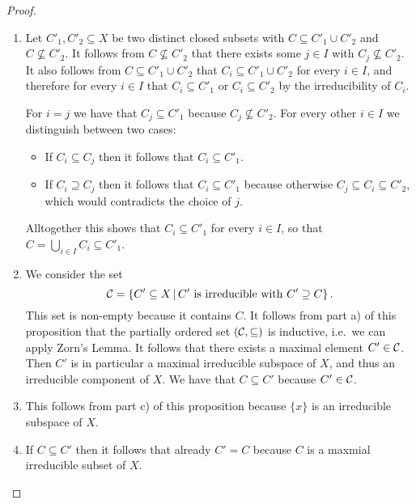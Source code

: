\begin{proof}
  \leavevmode
  \begin{enumerate}
    \item
      Let $C'_1, C'_2 \subseteq X$ be two distinct closed subsets with $C \subseteq C'_1 \cup C'_2$ and $C \nsubseteq C'_2$.
      It follows from $C \nsubseteq C'_2$ that there exists some $j \in I$ with $C_j \nsubseteq C'_2$.
      It also follows from $C \subseteq C'_1 \cup C'_2$ that $C_i \subseteq C'_1 \cup C'_2$ for every $i \in I$, and therefore for every $i \in I$ that $C_i \subseteq C'_1$ or $C_i \subseteq C'_2$ by the irreducibility of $C_i$.
      
      For $i = j$ we have that $C_j \subseteq C'_1$ because $C_j \nsubseteq C'_2$.
      For every other $i \in I$ we distinguish between two cases:
      \begin{itemize}
        \item
          If $C_i \subseteq C_j$ then it follows that $C_i \subseteq C'_1$.
        \item
          If $C_i \supseteq C_j$ then it follows that $C_i \subseteq C'_1$ because otherwise $C_j \subseteq C_i \subseteq C'_2$, which would contradicts the choice of $j$.
      \end{itemize}
      Alltogether this shows that $C_i \subseteq C'_1$ for every $i \in I$, so that $C = \bigcup_{i \in I} C_i \subseteq C'_1$.
    \item
      We consider the set
      \[
          \mc{C}
        = \{
            C' \subseteq X
          \suchthat
            \text{$C'$ is irreducible with $C' \supseteq C$}
          \} \,.
      \]
      This set is non-empty because it contains $C$.
      It follows from part a) of this proposition that the partially ordered set $(\mathcal{C},\subseteq)$ is inductive, i.e.\ we can apply Zorn’s Lemma.
      It follows that there exists a maximal element $C' \in \mathcal{C}$.
      Then $C'$ is in particular a maximal irreducible subspace of $X$, and thus an irreducible component of $X$.
      We have that $C \subseteq C'$ because $C' \in \mathcal{C}$.
    \item
      This follows from part c) of this proposition because $\{x\}$ is an irreducible subspace of $X$.
    \item
      If $C \subseteq C'$ then it follows that already $C' = C$ because $C$ is a maxmial irreducible subset of $X$.
    \qedhere
  \end{enumerate}
\end{proof}


